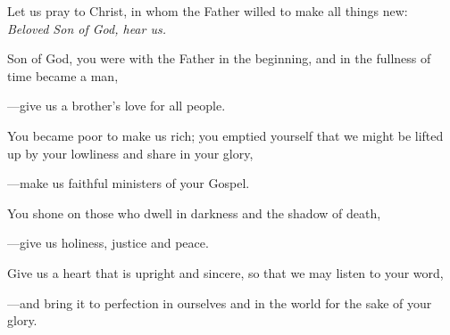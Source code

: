 \intercessions\indent

\begin{hangpar}

Let us pray to Christ, in whom the Father willed to make all things new:\\
\emph{Beloved Son of God, hear us.}

\medskip Son of God, you were with the Father in the beginning, and in the fullness of time became a man,

{\color{red}---\thinspace}give us a brother’s love for all people.

\medskip You became poor to make us rich; you emptied yourself that we might be lifted up by your lowliness and share in your glory,

{\color{red}---\thinspace}make us faithful ministers of your Gospel.

\medskip You shone on those who dwell in darkness and the shadow of death,

{\color{red}---\thinspace}give us holiness, justice and peace.

\medskip  Give us a heart that is upright and sincere, so that we may listen to your word,

{\color{red}---\thinspace}and bring it to perfection in ourselves and in the world for the sake of your glory.

\medskip

\end{hangpar}